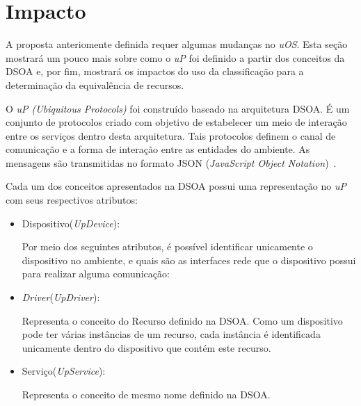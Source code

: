 \section{Impacto}
\label{sec:impactoUOS}

A proposta anteriomente definida requer algumas mudanças no \emph{uOS}. Esta seção mostrará um pouco mais sobre como o \emph{uP} foi definido a partir dos conceitos da DSOA e, por fim, mostrará os impactos do uso da classificação para a determinação da equivalência de recursos.

O \emph{uP (Ubiquitous Protocols)} foi construído baseado na arquitetura DSOA. É um conjunto de protocolos criado com objetivo de estabelecer um meio de interação entre os serviços dentro desta arquitetura. Tais protocolos definem o canal de comunicação e a forma de interação entre as entidades do ambiente. As mensagens são transmitidas no formato JSON (\emph{JavaScript Object Notation})~\cite{json}.

\begin{comment}
, que utiliza a codificação UTF-8~\cite{utf8}, que foi escolhido por ser um formato estruturado, leve e independente de plataforma. O JSON foi utilizado ante o XML, pois possui menor tamanho de mensagens e esse fator pode ser decisivo em um ambiente com diversos dipositivos com capacidades computacionais diferentes e possivelmente reduzidas. Dessa forma a limitação dos dispositivos é minimizada e exclui a necessidade de uma rede para tratamento dessas mensagens.
\end{comment}

Cada um dos conceitos apresentados na DSOA possui uma representação no \emph{uP} com seus respectivos atributos:

\begin{itemize}
	\item Dispositivo(\emph{UpDevice}):
	
		Por meio dos seguintes atributos, é possível identificar unicamente o dispositivo no ambiente, e quais são as interfaces rede que o dispositivo possui para realizar alguma comunicação:

	\item \emph{Driver}(\emph{UpDriver}): 

		Representa o conceito do Recurso definido na DSOA. Como um dispositivo pode ter várias instâncias de um recurso, cada instância é identificada unicamente dentro do dispositivo que contém este recurso.

	\item Serviço(\emph{UpService}): 

		Representa o conceito de mesmo nome definido na DSOA.
\end{itemize}

